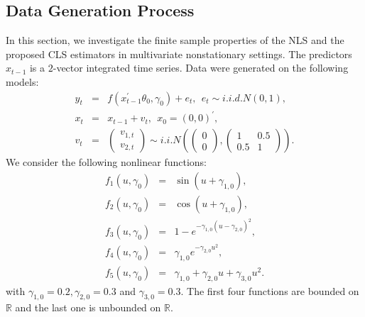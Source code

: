 \documentclass[a4paper,12pt,times,numbered,print,index]{report}
\numberwithin{equation}{section}
\begin{document}
	\subsection{Data Generation Process}
	In this section, we investigate the finite sample properties of the NLS and the proposed CLS estimators in multivariate nonstationary settings. The predictors $x_{t-1}$ is a $2$-vector integrated time series. Data were generated on the following models:%
	\begin{eqnarray}
		\label{DGP}
		y_{t} &=&f\left( x_{t-1}^{\prime }\theta _{0},\gamma _{0}\right) +e_{t},\ \
		e_{t}\sim i.i.d. N\left( 0,1\right) , \nonumber \\
		x_{t} &=& x_{t-1}+v_{t}, \ \ x_{0}=\left( 0,0\right) ^{\prime }, \nonumber \\
		v_{t} &=&\left(\begin{array}{c}
			v_{1, t} \\
			v_{2, t}
		\end{array}\right) \sim i.i.N\left(\left(\begin{array}{c}
			0 \\
			0
		\end{array}\right),\left(\begin{array}{cc}
			1 & 0.5 \nonumber \\
			0.5 & 1
		\end{array}\right)\right).
	\end{eqnarray}
	We consider the following nonlinear functions:%
	\begin{eqnarray}
		\label{functions}
		f_{1}\left( u,\gamma _{0}\right) &=&\sin \left( u+\gamma _{1,0}\right), \nonumber \\
		f_{2}\left( u,\gamma _{0}\right) &=&\cos \left( u+\gamma _{1,0}\right), \nonumber \\
		f_{3}\left( u,\gamma _{0}\right) &=& 1-e^{-\gamma_{1,0}\left(u-\gamma_{2,0}\right)^{2}}, \\
		f_{4}\left( u,\gamma _{0}\right) &=& \gamma_{1,0} e^{-\gamma_{2,0}u^2},\nonumber  \\
		f_{5}\left( u,\gamma _{0}\right) &=&\gamma_{1,0}+\gamma_{2,0}u+\gamma _{3,0}u^{2}. \nonumber 
	\end{eqnarray}%
	with $\gamma_{1,0}= 0.2,\gamma_{2,0}= 0.3$ and $\gamma_{3,0}= 0.3.$ The first four functions are bounded on $\mathbb{R}$ and the last one is
	unbounded on $\mathbb{R}$. 
	
\end{document}
